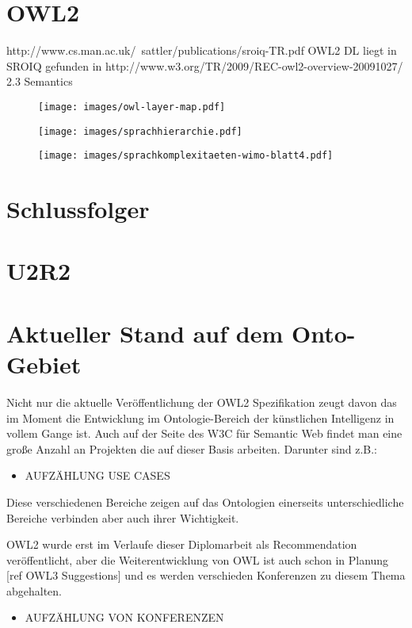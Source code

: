 \section{OWL2}
 http://www.cs.man.ac.uk/~sattler/publications/sroiq-TR.pdf
OWL2 DL liegt in SROIQ
gefunden in  http://www.w3.org/TR/2009/REC-owl2-overview-20091027/
2.3 Semantics
\begin{figure}
\texttt{[image: images/owl-layer-map.pdf]}
\end{figure}

\begin{figure}
\texttt{[image: images/sprachhierarchie.pdf]}
\end{figure}

\begin{figure}
\texttt{[image: images/sprachkomplexitaeten-wimo-blatt4.pdf]}
\end{figure}

\section{Schlussfolger}

\section{U2R2}

\section{Aktueller Stand auf dem Onto-Gebiet}
Nicht nur die aktuelle Veröffentlichung der OWL2 Spezifikation zeugt davon das im Moment die Entwicklung im Ontologie-Bereich der künstlichen Intelligenz in vollem Gange ist. Auch auf der Seite des W3C für Semantic Web findet man eine große Anzahl an Projekten die auf dieser Basis arbeiten.
Darunter sind z.B.:
\begin{itemize}
  \item AUFZÄHLUNG USE CASES
\end{itemize}
Diese verschiedenen Bereiche zeigen auf das Ontologien einerseits unterschiedliche Bereiche verbinden aber auch ihrer Wichtigkeit.

OWL2 wurde erst im Verlaufe dieser Diplomarbeit als Recommendation veröffentlicht, aber die Weiterentwicklung von OWL ist auch schon in Planung [ref OWL3 Suggestions] und es werden verschieden Konferenzen zu diesem Thema abgehalten.
\begin{itemize}
  \item AUFZÄHLUNG VON KONFERENZEN
\end{itemize}

